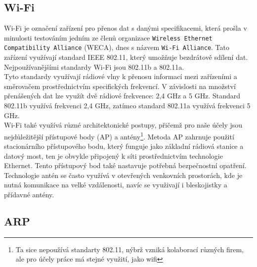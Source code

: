 \documentclass[12pt]{report}			%
\begin{document}
				\subsection{Wi-Fi}
				
				
Wi-Fi je označení zařízení pro přenos dat s danými specifikacemi, která prošla v minulosti testováním jedním ze členů organizace \texttt{Wireless Ethernet Compatibility Alliance} (WECA),  dnes s názvem \texttt{Wi-Fi Alliance}. Tato zařízení využívají standard IEEE 802.11, který umožňuje bezdrátově sdílení dat. Nejpoužívanějšími standardy Wi-Fi jsou 802.11b a 802.11a.
\\
Tyto standardy využívají rádiové vlny k přenosu informací mezi zařízeními a směrovačem prostřednictvím specifických frekvencí. V závislosti na množství přenášených dat lze využít dvě rádiové frekvence: 2,4 GHz a 5 GHz. Standard 802.11b využívá frekvenci 2,4 GHz, zatímco standard 802.11a využívá frekvenci 5 GHz.
\\
Wi-Fi také využívá různé architektonické postupy, přičemž pro naše účely jsou nejdůležitější přístupové body (AP) a antény\footnote{Ta sice nepoužívá standarty 802.11, nýbrž vzniká kolaborací různých firem, ale pro účely práce má stejné využití, jako wifi}. Metoda AP zahrnuje použití stacionárního přístupového bodu, který funguje jako základní rádiová stanice a datový most, ten je obvykle připojený k síti prostřednictvím technologie Ethernet. Tento přístupový bod také nastavuje potřebná bezpečnostní opatření.
\\
Technologie antén se často využívá v otevřených venkovních prostorách, kde je nutná komunikace na velké vzdálenosti, navíc se využivají i bleskojistky a přídavné antény.\cite{WiFi1}\cite{WiFi2}\cite{WiFi3}\cite{Pruvodce}


				\subsection{ARP}
				
\end{document}
